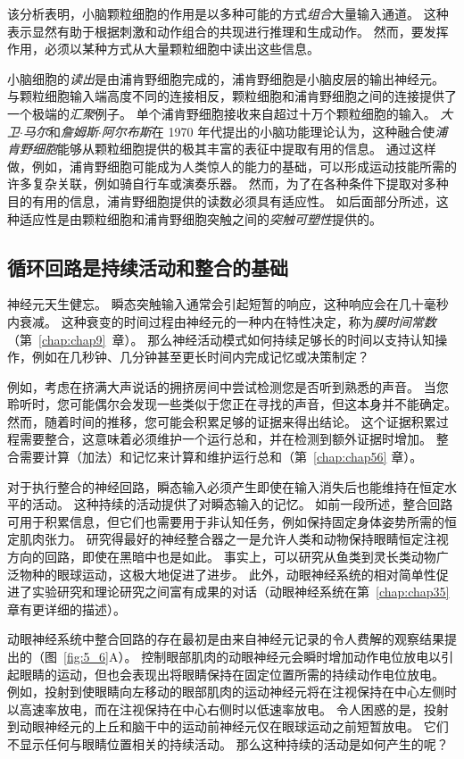 该分析表明，小脑颗粒细胞的作用是以多种可能的方式\textit{组合}大量输入通道。
这种表示显然有助于根据刺激和动作组合的共现进行推理和生成动作。
然而，要发挥作用，必须以某种方式从大量颗粒细胞中读出这些信息。


小脑细胞的\textit{读出}是由浦肯野细胞完成的，浦肯野细胞是小脑皮层的输出神经元。
与颗粒细胞输入端高度不同的连接相反，颗粒细胞和浦肯野细胞之间的连接提供了一个极端的\textit{汇聚}例子。
单个浦肯野细胞接收来自超过十万个颗粒细胞的输入。
\textit{大卫$\cdot$马尔}和\textit{詹姆斯$\cdot$阿尔布斯}在 1970 年代提出的小脑功能理论认为，这种融合使\textit{浦肯野细胞}能够从颗粒细胞提供的极其丰富的表征中提取有用的信息。
通过这样做，例如，浦肯野细胞可能成为人类惊人的能力的基础，可以形成运动技能所需的许多复杂关联，例如骑自行车或演奏乐器。
然而，为了在各种条件下提取对多种目的有用的信息，浦肯野细胞提供的读数必须具有适应性。
如后面部分所述，这种适应性是由颗粒细胞和浦肯野细胞突触之间的\textit{突触可塑性}提供的。



\subsection{循环回路是持续活动和整合的基础}

神经元天生健忘。 
瞬态突触输入通常会引起短暂的响应，这种响应会在几十毫秒内衰减。
这种衰变的时间过程由神经元的一种内在特性决定，称为\textit{膜时间常数}（第~\ref{chap:chap9}~章）。
那么神经活动模式如何持续足够长的时间以支持认知操作，例如在几秒钟、几分钟甚至更长时间内完成记忆或决策制定？


例如，考虑在挤满大声说话的拥挤房间中尝试检测您是否听到熟悉的声音。
当您聆听时，您可能偶尔会发现一些类似于您正在寻找的声音，但这本身并不能确定。
然而，随着时间的推移，您可能会积累足够的证据来得出结论。
这个证据积累过程需要整合，这意味着必须维护一个运行总和，并在检测到额外证据时增加。
整合需要计算（加法）和记忆来计算和维护运行总和（第~\ref{chap:chap56} 章）。


对于执行整合的神经回路，瞬态输入必须产生即使在输入消失后也能维持在恒定水平的活动。
这种持续的活动提供了对瞬态输入的记忆。
如前一段所述，整合回路可用于积累信息，但它们也需要用于非认知任务，例如保持固定身体姿势所需的恒定肌肉张力。
研究得最好的神经整合器之一是允许人类和动物保持眼睛恒定注视方向的回路，即使在黑暗中也是如此。
事实上，可以研究从鱼类到灵长类动物广泛物种的眼球运动，这极大地促进了进步。
此外，动眼神经系统的相对简单性促进了实验研究和理论研究之间富有成果的对话（动眼神经系统在第~\ref{chap:chap35} 章有更详细的描述）。


动眼神经系统中整合回路的存在最初是由来自神经元记录的令人费解的观察结果提出的（图~\ref{fig:5_6}A）。
控制眼部肌肉的动眼神经元会瞬时增加动作电位放电以引起眼睛的运动，但也会表现出将眼睛保持在固定位置所需的持续动作电位放电。
例如，投射到使眼睛向左移动的眼部肌肉的运动神经元将在注视保持在中心左侧时以高速率放电，而在注视保持在中心右侧时以低速率放电。
令人困惑的是，投射到动眼神经元的上丘和脑干中的运动前神经元仅在眼球运动之前短暂放电。
它们不显示任何与眼睛位置相关的持续活动。
那么这种持续的活动是如何产生的呢？


